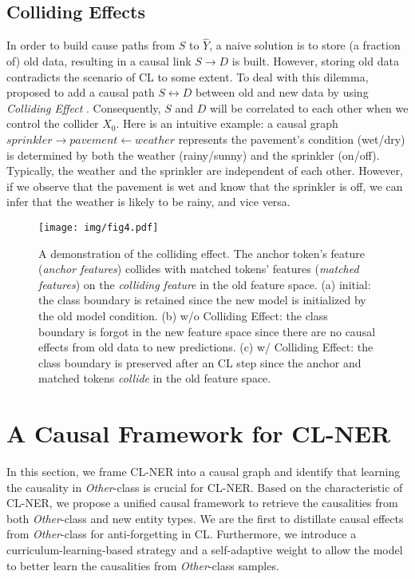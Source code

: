 \documentclass[11pt]{article}
\begin{document}
\subsection{Colliding Effects}
In order to build cause paths from $S$ to $\hat{Y}$, a naive solution is to store (a fraction of) old data, resulting in a causal link $S \rightarrow D$ is built.
However, storing old data contradicts the scenario of CL to some extent.
To deal with this dilemma, \citet{hu2021distilling} proposed to add a causal path $S \leftrightarrow D$  between old and new data by using \textit{Colliding Effect} \citep{glymour2016causal}. 
Consequently, $S$ and $D$ will be correlated to each other when we control the collider $X_0$.
Here is an intuitive example: a causal graph $sprinkler \rightarrow pavement \leftarrow weather$ represents the pavement's condition (wet/dry) is determined by both the weather (rainy/sunny) and the sprinkler (on/off).
Typically, the weather and the sprinkler are independent of each other.
However, if we observe that the pavement is wet and know that the sprinkler is off, we can infer that the weather is likely to be rainy, and vice versa.

\begin{figure*}[t]
    \centering
    \texttt{[image: img/fig4.pdf]}
    \caption{A demonstration of the colliding effect. The anchor token's feature (\textit{anchor features}) collides with matched tokens' features (\textit{matched features}) on the \textit{colliding feature} in the old feature space. (a) initial: the class boundary is retained since the new model is initialized by the old model condition. (b) w/o Colliding Effect: the class boundary is forgot in the new feature space since there are no causal effects from old data to new predictions. (c) w/ Colliding Effect: the class boundary is preserved after an CL step since the anchor and matched tokens \textit{collide} in the old feature space.}
    \label{fig4}
\end{figure*}

\section{A Causal Framework for CL-NER}
In this section, we frame CL-NER into a causal graph and identify that learning the causality in \textit{Other}-class is crucial for CL-NER.
Based on the characteristic of CL-NER, we propose a unified causal framework to retrieve the causalities from both \textit{Other}-class and new entity types.
We are the first to distillate causal effects from \textit{Other}-class for anti-forgetting in CL.
Furthermore, we introduce a curriculum-learning-based strategy and a self-adaptive weight to allow the model to better learn the causalities from \textit{Other}-class samples.
\end{document}
